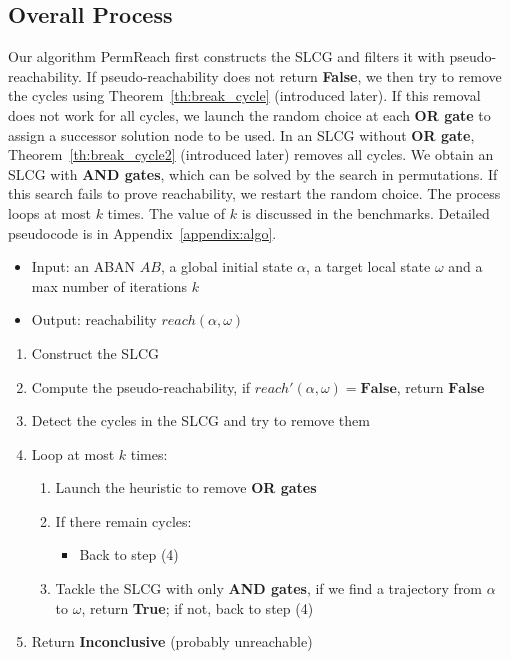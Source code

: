 \documentclass{article}
\theoremstyle{definition}
\begin{document}
\subsection{Overall Process}\label{sectOverall}
Our algorithm PermReach first constructs the SLCG and filters it with pseudo-reachability. 
If pseudo-reachability does not return \textbf{False}, we then try to remove the cycles using Theorem~\ref{th:break_cycle} (introduced later).
If this removal does not work for all cycles, we launch the random choice at each \textbf{OR gate} to assign a successor solution node to be used.
In an SLCG without \textbf{OR gate}, Theorem~\ref{th:break_cycle2} (introduced later) removes all cycles.
We obtain an SLCG with \textbf{AND gates}, which can be solved by the search in permutations.
If this search fails to prove reachability, we restart the random choice.
The process loops at most $k$ times.
The value of $k$ is discussed in the benchmarks.
Detailed pseudocode is in Appendix~\ref{appendix:algo}.
\begin{itemize}
    \item Input: an ABAN $AB$, a global initial state $\alpha$, a target local state $\omega$ and a max number of iterations $k$
    \item Output: reachability $reach(\alpha, \omega)$
\end{itemize}
\begin{enumerate}
\item Construct the SLCG
\item Compute the pseudo-reachability, if $reach'(\alpha,\omega)=\mathbf{False}$, return $\mathbf{False}$
\item Detect the cycles in the SLCG and try to remove them 
\item Loop at most $k$ times:
\begin{enumerate}
    \item Launch the heuristic to remove \textbf{OR gates} 
    \item If there remain cycles:
    \begin{itemize}
        \item Back to step (4)
    \end{itemize}
    \item Tackle the SLCG with only \textbf{AND gates}, if we find a trajectory from $\alpha$ to $\omega$, return \textbf{True}; if not, back to step (4)
\end{enumerate}
\item Return \textbf{Inconclusive} (probably unreachable)
\end{enumerate}
\end{document}
